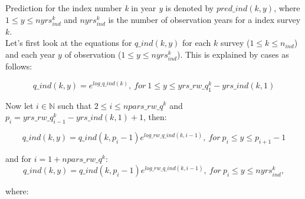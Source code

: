 \documentclass{article}
\begin{document}
Prediction for the index number \textit{k} in year \textit{y} is denoted by $pred\_ind(k,y)$, where $1\leq y \leq nyrs_{ind}^k$ and $nyrs_{ind}^k$ is the number of observation years for a index survey $k$.\\

Let's first look at the equations for $q\_ind(k,y)$ for each $k$ survey ($1\leq k \leq n_{ind}$) and each year $y$ of observation ($1\leq y \leq nyrs_{ind}^k$). This is explained by cases as follows:

\begin{equation}
q\_ind(k,y) = e^{log\_q\_ind(k)}, \ for \ 1\leq y \leq yrs\_rw\_q^k_1 %
-yrs\_ind(k,1)
\end{equation}

Now let $i\in\mathbb{N}$ such that $2\leq i \leq npars\_rw\_q^k$ and $p_i=yrs\_rw\_q^k_{i-1}-yrs\_ind(k,1)+1$, then:

\begin{equation}
    q\_ind(k,y) = q\_ind(k,p_i -1)e^{log\_rw\_q\_ind(k,i-1)}, \ for \ p_i\leq y \leq p_{i+1}-1
\end{equation}

and for $i=1+npars\_rw\_q^k :$
\begin{equation}
    q\_ind(k,y)  = q\_ind(k,p_i-1) e^{log\_rw\_q\_ind(k,i-1)}, \ for \ p_i\leq y \leq nyrs^k_{ind},
\end{equation}


where:
\end{document}
